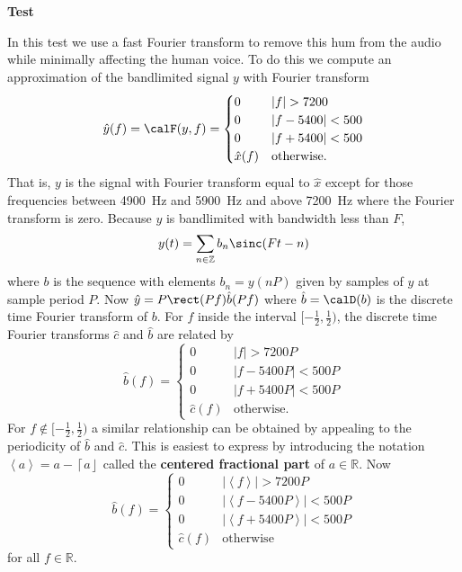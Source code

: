 \documentclass[11pt,a4paper]{book}
\theoremstyle{plain}
\numberwithin{equation}{section}
\newcommand{\reals}{{\mathbb R}}
\newcommand{\ints}{{\mathbb Z}}
\newcommand{\term}{\textbf}
\newcommand{\abs}[1]{\left\vert #1 \right\vert}
\newcommand{\round}[1]{{\left\lceil #1 \right\rfloor}}
\newcommand{\fracpart}[1]{\left\langle #1 \right\rangle}
\newcounter{test}
\newenvironment{test}{
\begin{shaded}\refstepcounter{test}\par\noindent%
\textbf{Test \thetest}
}{
\end{shaded}
}
\begin{document}
\begin{test}
In this test we use a fast Fourier transform to remove this hum from the audio while minimally affecting the human voice.  To do this we compute an approximation of the bandlimited signal $y$ with Fourier transform
\[
\hat{y}(f) = \calF(y,f) = \begin{cases}
0 & \abs{f} > 7200 \\
0 & \abs{f-5400} < 500 \\
0 & \abs{f+5400} < 500 \\
\hat{x}(f) & \text{otherwise}.
\end{cases}
\]
That is, $y$ is the signal with Fourier transform equal to $\hat{x}$ except for those frequencies between \SI{4900}{\hertz} and \SI{5900}{\hertz} and above \SI{7200}{\hertz} where the Fourier transform is zero.  Because $y$ is bandlimited with bandwidth less than $F$,
\[
y(t) = \sum_{n \in \ints} b_n \sinc(Ft - n)
\]
where $b$ is the sequence with elements $b_n = y(nP)$ given by samples of $y$ at sample period $P$.  Now $\hat{y} = P \rect(Pf) \hat{b}(Pf)$ where $\hat{b}=\calD(b)$ is the discrete time Fourier transform of $b$.  For $f$ inside the interval $[-\tfrac{1}{2},\tfrac{1}{2})$, the discrete time Fourier transforms $\hat{c}$ and $\hat{b}$ are related by
\[
\hat{b}(f) = \begin{cases}
0 & \abs{f} > 7200P \\
0 & \abs{f-5400P} < 500P \\
0 & \abs{f+5400P} < 500P \\
\hat{c}(f) & \text{otherwise}.
\end{cases}
\]
For $f \notin [-\tfrac{1}{2},\tfrac{1}{2})$ a similar relationship can be obtained by appealing to the periodicity of $\hat{b}$ and $\hat{c}$.  This is easiest to express by introducing the notation $\fracpart{a} = a - \round{a}$ called the \term{centered fractional part} of $a \in \reals$.  Now
\[
\hat{b}(f) = \begin{cases}
0 & \abs{\fracpart{f}} > 7200P \\
0 & \abs{\fracpart{f-5400P}} < 500P \\
0 & \abs{\fracpart{f+5400P}} < 500P \\
\hat{c}(f) & \text{otherwise}
\end{cases}
\]
for all $f \in \reals$.


\end{test}
\end{document}
